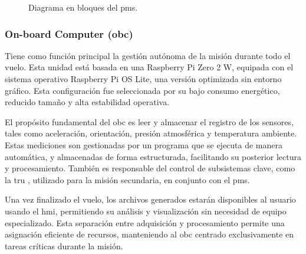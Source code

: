 \begin{figure}[H]
{
      }
      \caption{Diagrama en bloques del \acrshort{pms}.}
      \label{fig:sistema_pms}
    \end{figure}

  \subsubsection{On-board Computer (\acrshort{obc})}
    Tiene como función principal la gestión autónoma de la misión
    durante todo el vuelo. Esta unidad está basada en una Raspberry Pi Zero 2 W, equipada con el sistema operativo
    Raspberry Pi OS Lite, una versión optimizada sin entorno gráfico. Esta configuración fue seleccionada por su
    bajo consumo energético, reducido tamaño y alta estabilidad operativa.

    El propósito fundamental del \acrshort{obc} es leer y almacenar el registro de los sensores, tales como
    aceleración, orientación, presión atmosférica y temperatura ambiente. Estas mediciones son gestionadas por un
    programa que se ejecuta de manera automática, y almacenadas de forma estructurada, facilitando su posterior
    lectura y procesamiento. También es responsable del control de subsistemas clave, como la \acrfull{tru} , utilizado
    para la misión secundaria, en conjunto con el \acrfull{pms}.

    Una vez finalizado el vuelo, los archivos generados estarán disponibles al usuario usando el \acrshort{hmi},
    permitiendo su análisis y visualización sin necesidad de equipo especializado. Esta separación entre adquisición
    y procesamiento permite una asignación eficiente de recursos, manteniendo al \acrshort{obc} centrado
    exclusivamente en tareas críticas durante la misión.

